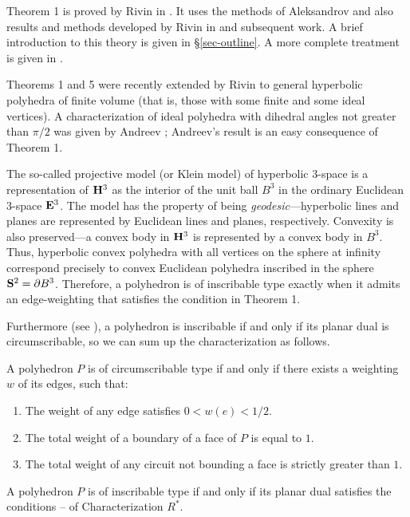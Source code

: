 Theorem 1 is proved by Rivin in \cite{ri:ichar}. It
uses the methods of Aleksandrov \cite{Alek50}
and also results and methods developed by Rivin in 
\cite{rivi86,
R1}  and subsequent work. A brief introduction to this 
theory is
given in \S \ref{sec-outline}. A more complete treatment 
is given
in \cite{HR1}. 

\begin{Notes}
Theorems 1 and 5 were recently extended by Rivin to
general hyperbolic polyhedra of finite volume (that is, 
those with
some finite and some ideal vertices).
A characterization of ideal polyhedra with dihedral angles 
not
greater than $\pi/2$ was given by Andreev \cite{Andr70b};
Andreev's result is an easy consequence of Theorem 1.
\end{Notes}

The so-called projective model (or Klein model) of 
hyperbolic 3-space is a
representation of $\bold{H}^3$ as the interior of the unit ball 
$B^3$ in the
ordinary Euclidean 3-space $\bold{E}^3$. The model has the 
property of being {\it
geodesic}---hyperbolic lines and planes are represented by
Euclidean lines and planes, respectively. Convexity is 
also preserved---a
convex body in $\bold{H}^3$ is represented by a convex body in
$B^3$. Thus, hyperbolic convex polyhedra with all vertices 
on the
sphere at infinity correspond precisely to convex 
Euclidean polyhedra
inscribed in the sphere $\bold{S}^2 = \partial B^3$.
Therefore, a polyhedron
is of inscribable type exactly when it admits an 
edge-weighting that
satisfies the condition in Theorem 1. 

Furthermore (see \cite{gru:conp}), a polyhedron is
inscribable if and only if its planar dual is 
circumscribable, so we
can sum up the characterization as follows. 
\begin{chRast}
A polyhedron $P$ is of circumscribable type if
and only if there exists a weighting $w$ of its edges, 
such that\/\RM:
\begin{enumerate}
\item The weight of any edge satisfies $0<w(e)<1/2.$
\item The total weight of a boundary of a face of $P$ is 
equal to
$1.$
\item The total weight of any circuit not bounding a face is
strictly greater than $1$.
\end{enumerate}
\end{chRast}
\begin{chR}
A polyhedron $P$ is of inscribable type if and only if its 
planar dual
satisfies the conditions -- of 
Characterization $R^*$.
\end{chR}

